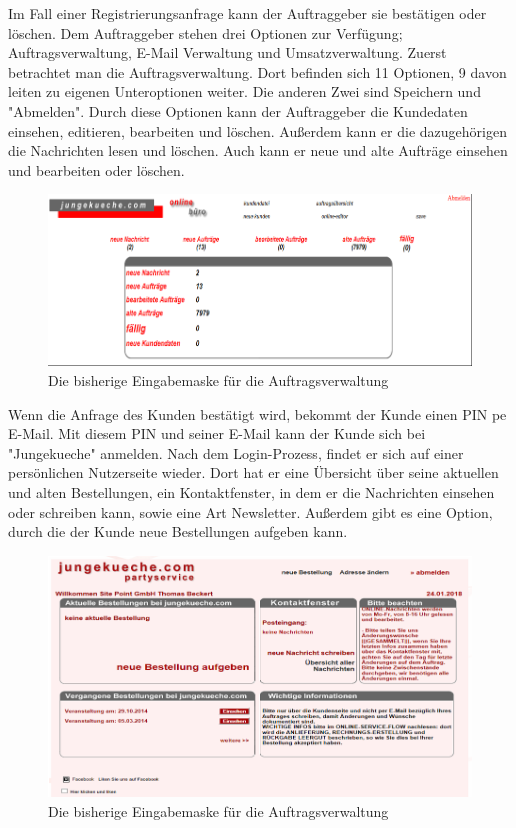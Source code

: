 Im Fall einer Registrierungsanfrage kann der Auftraggeber sie bestätigen oder löschen. Dem Auftraggeber stehen drei Optionen zur Verfügung; Auftragsverwaltung, E-Mail Verwaltung und Umsatzverwaltung. Zuerst betrachtet man die Auftragsverwaltung. Dort befinden sich 11 Optionen, 9 davon leiten zu eigenen Unteroptionen weiter. Die anderen Zwei sind Speichern und "Abmelden". Durch diese Optionen kann der Auftraggeber die Kundedaten einsehen, editieren, bearbeiten und löschen. Außerdem kann er die dazugehörigen die Nachrichten lesen und löschen. Auch kann er neue und alte Aufträge einsehen und bearbeiten oder löschen.

\begin{figure}[h]
	\centering
	\includegraphics[width=0.7\linewidth]{Graphics/Auftragverwaltung.png}
	\caption[Auftragsverwaltung]{Die bisherige Eingabemaske für die Auftragsverwaltung}
	\label{fig:Auftragverwaltung}
\end{figure}

Wenn die Anfrage des Kunden bestätigt wird, bekommt der Kunde einen PIN pe E-Mail. Mit diesem PIN und seiner E-Mail kann der Kunde sich bei "Jungekueche" anmelden. Nach dem Login-Prozess, findet er sich auf einer persönlichen Nutzerseite wieder. Dort hat er eine Übersicht über seine aktuellen und alten Bestellungen, ein Kontaktfenster, in dem er die Nachrichten einsehen oder schreiben kann, sowie eine Art Newsletter. Außerdem gibt es eine Option, durch die der Kunde neue Bestellungen aufgeben kann.  

\begin{figure}[h]
	\centering
	\includegraphics[width=0.7\linewidth]{Graphics/KundenAnsicht.png}
	\caption[Kundeansicht]{Die bisherige Eingabemaske für die Auftragsverwaltung}
	\label{fig:KundenAnsicht}
\end{figure}

